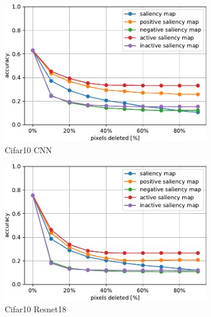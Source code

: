 \documentclass[preprint,12pt]{elsarticle}
\begin{document}
\begin{figure}[h]
    \centering
    \begin{subfigure}{0.49\linewidth}
        \centering
        \includegraphics[width=\linewidth]{../visualizations/benchmarks/white_deletion/cifar10_cnn.pdf}
        \caption{Cifar10 CNN}
    \end{subfigure}
    \hfill
    \begin{subfigure}{0.49\linewidth}
        \centering
        \includegraphics[width=\linewidth]{../visualizations/benchmarks/white_deletion/cifar10_resnet18.pdf}
        \caption{Cifar10 Resnet18}
    \end{subfigure}\\
    \hfill
    \begin{subfigure}{0.49\textwidth}
        \centering

\end{subfigure}
\end{figure}
\end{document}
